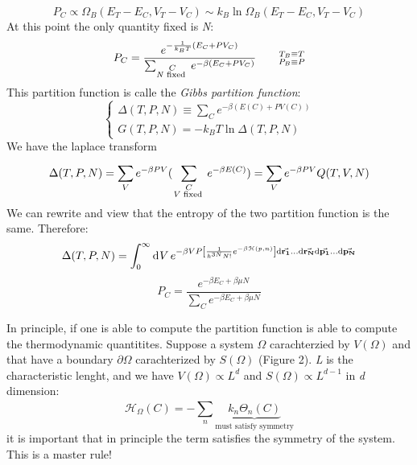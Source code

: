 \documentclass[../main/main.tex]{subfiles}
\begin{document}
\begin{equation}
  P_C \propto \Omega _B (E_T-E_C, V_T-V_C) \sim k_B \ln{\Omega _B (E_T-E_C, V_T-V_C)}
  \label{eq:}
\end{equation}
At this point the only quantity fixed is \emph{N}:
\begin{equation}
  P_C = \frac{e^{-\frac{1}{k_B T} (E_C + P V_C)} }{\sum_{\substack{ C \\  \text{\emph{N} fixed } } }^{} e^{-\beta (E_C + P V_C)}   } \qquad \substack{T_B \equiv T \\ P_B \equiv P}
  \label{eq:}
\end{equation}
This partition function is calle the \emph{Gibbs partition function}:
\begin{equation}
  \begin{cases}
   \Delta (T,P,N) \equiv \sum_{C}^{} e^{-\beta (E(C) + P V(C))}   \\
   G(T,P,N) = -k_B T \ln{\Delta (T,P,N)}
  \end{cases}
\label{eq:}
\end{equation}
We have the laplace transform
\begin{equation}
  \Delta (T,P,N) = \sum_{V}^{} e^{-\beta P V} (\sum_{\substack{ C \\  \text{\emph{V} fixed } } }^{} e^{-\beta E(C)}  )  = \sum_{V}^{} e^{-\beta P V} Q(T,V,N)
  \label{eq:}
\end{equation}
We can rewrite and view that the entropy of the two partition function is the same. Therefore:
\begin{equation}
  \Delta (T,P,N) = \int_{0}^{\infty } \dd[]{V}  e^{-\beta V P \qty[\frac{1}{h^{3N} N!} e^{-\beta \mathcal{H} (p,n)} ] \dd{\va{r_1} } \dots \dd{\va{r_N} } \dd{\va{p_1} } \dots \dd{\va{p_N} } }
  \label{eq:}
\end{equation}
\begin{equation}
  P_C = \frac{e^{-\beta E_C + \beta \mu N} }{ \sum_{C}^{} e^{-\beta E_C + \beta \mu N} }
  \label{eq:}
\end{equation}

In principle, if one is able to compute the partition function is able to compute the thermodynamic quantitites.
Suppose a system \( \Omega  \) carachterzied by \( V(\Omega ) \) and that have a boundary \( \partial{\Omega }  \) carachterized by \( S(\Omega ) \) (Figure 2).
\emph{L} is the characteristic lenght, and we have \( V(\Omega ) \propto L^d \) and \( S(\Omega) \propto L^{d-1} \)  in \emph{d} dimension:
\begin{equation}
  \mathcal{H}_{\Omega } (C) = - \sum_{n}^{} \underbrace{ k_n \Theta _n (C)}_{\text{must satisfy symmetry}}
  \label{eq:}
\end{equation}
it is important that in principle the term satisfies the symmetry of the system.
This is a master rule!
\end{document}
